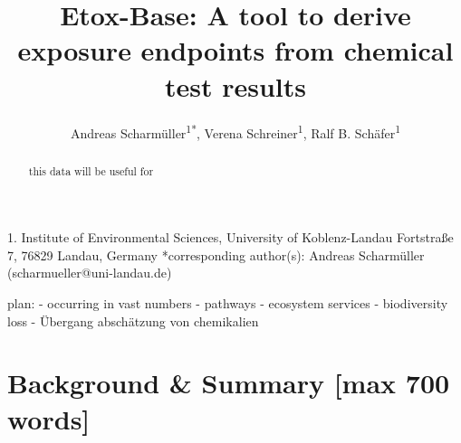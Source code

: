 \documentclass[english]{article}
\begin{document}
\title{Etox-Base: A tool to derive exposure endpoints from chemical test results}

\author{Andreas Scharm{\"u}ller\textsuperscript{1{*}},
        Verena Schreiner\textsuperscript{1},
        Ralf B. Sch{\"a}fer\textsuperscript{1}}

\maketitle
\thispagestyle{fancy}

1. Institute of Environmental Sciences, University of Koblenz-Landau Fortstraße 7, 76829 Landau, Germany {*}corresponding author(s):
Andreas Scharm{\"u}ller (scharmueller@uni-landau.de)

\begin{abstract}

this data will be useful for

\end{abstract}

plan:
- occurring in vast numbers
- pathways
- ecosystem services 
- biodiversity loss
- Übergang abschätzung von chemikalien


\section*{Background \& Summary [max 700 words]}
\end{document}
